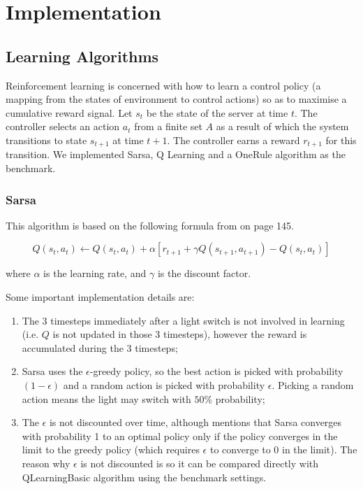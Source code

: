 \section{Implementation}

\subsection{Learning Algorithms}

Reinforcement learning is concerned with how to learn a control policy (a mapping from the states of environment to control actions) so as to maximise a cumulative reward signal. Let $s_t$ be the state of the server at time $t$. The controller selects an action $a_t$ from a finite set $A$ as a result of which the system transitions to state $s_{t+1}$ at time $t+1$. The controller earns a reward $r_{t+1}$ for this transition. We implemented Sarsa, Q Learning and a OneRule algorithm as the benchmark.

\subsubsection{Sarsa}

This algorithm is based on the following formula from \cite{Sutton_1998} on page 145.

\begin{equation}
Q(s_{t},a_{t})\leftarrow Q(s_{t},a_{t}) + \alpha [ r_{t+1}+\gamma Q(s_{t+1},a_{t+1}) - Q(s_{t},a_{t}) ]
\end{equation}

where $\alpha $ is the learning rate, and $\gamma $ is the discount factor.

Some important implementation details are:

\begin{enumerate}
\item The 3 timesteps immediately
after a light switch is not involved in learning (i.e. $Q$ is not
updated in those 3 timesteps), however the reward is accumulated
during the 3 timesteps;

\item Sarsa uses the $\epsilon $-greedy policy, so
the best action is picked with probability $(1-\epsilon )$ and a
random action is picked with probability $\epsilon $. Picking
a random action means the light may switch with $50\%$ probability;

\item The $\epsilon $ is not discounted over time, although \cite{Sutton_1998}
mentions that Sarsa converges with probability 1 to an optimal policy
only if the policy converges in the limit to the greedy policy (which
requires $\epsilon $ to converge to 0 in the limit). The reason why
$\epsilon $ is not discounted is so it can be compared directly with
QLearningBasic algorithm using the benchmark settings.

\end{enumerate}

